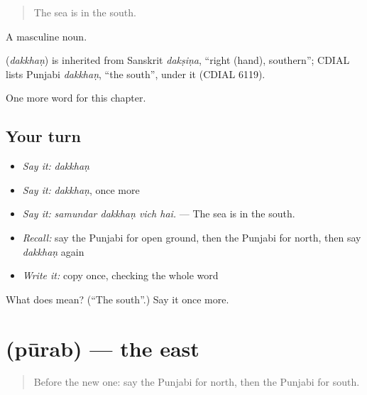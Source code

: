 \begin{quote}
The sea is in the south.
\end{quote}

A masculine noun.

\begin{cousinweb}
\textbf{} (\emph{dakkhaṇ}) is inherited from Sanskrit \emph{dakṣiṇa}, \textquotedblleft{}right (hand), southern\textquotedblright{}; CDIAL lists Punjabi \emph{dakkhaṇ}, \textquotedblleft{}the south\textquotedblright{}, under it (CDIAL 6119).
\end{cousinweb}

\begin{grammarlens}[title={What you've built}]
One more word for this chapter.
\end{grammarlens}

\subsection*{Your turn}
\begin{itemize}
\raggedright
  \item \emph{Say it:} \emph{dakkhaṇ}
  \item \emph{Say it:} \emph{dakkhaṇ}, once more
  \item \emph{Say it:} \emph{samundar dakkhaṇ vich hai.} — The sea is in the south.
  \item \emph{Recall:} say the Punjabi for open ground, then the Punjabi for north, then say \emph{dakkhaṇ} again
  \item \emph{Write it:} copy \textbf{} once, checking the whole word
\end{itemize}

\begin{tcolorbox}[breakable,colback=teal!4,colframe=teal!35!black,title={Before you move on}]
What does  mean? (\textquotedblleft{}The south\textquotedblright{}.) Say it once more.
\end{tcolorbox}
\section[\texorpdfstring{\pa{ਪੂਰਬ} (pūrab)}{ਪੂਰਬ (pūrab)}]{ (pūrab) — the east}

\label{lesson:PA-C271-purab}



\begin{quote}
Before the new one: say the Punjabi for north, then the Punjabi for south.
\end{quote}

